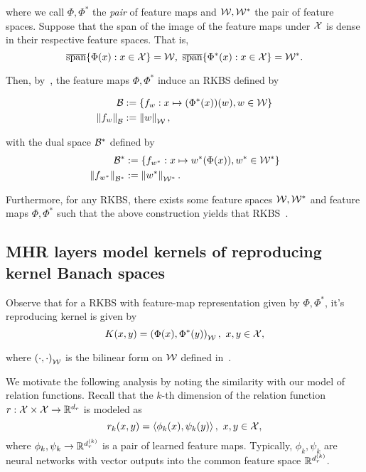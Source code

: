 \noindent where we call $\Phi, \Phi^*$ the \textit{pair} of feature maps and ${\mathcal{W}}, {\mathcal{W}}^*$ the pair of feature spaces. Suppose that the span of the image of the feature maps under ${\mathcal{X}}$ is dense in their respective feature spaces. That is,
\begin{equation}
    \overline{\text{span}}\{\Phi(x): x \in {\mathcal{X}}\} = {\mathcal{W}}, \ \overline{\text{span}}\{\Phi^*(x): x \in {\mathcal{X}}\} = {\mathcal{W}}^*.
\end{equation}

Then, by~\parencite[Theorem 3]{zhangReproducingKernel2009}, the feature maps $\Phi, \Phi^*$ induce an RKBS defined by

\begin{align}
    {\mathcal{B}} &:= \left\{f_w: x \mapsto (\Phi^*(x))(w), w \in {\mathcal{W}}\right\} \\
    \left\lVert f_w\right\rVert_{\mathcal{B}} &:= \left\lVert w\right\rVert_{\mathcal{W}},
\end{align}

\noindent with the dual space ${\mathcal{B}}^*$ defined by
\begin{align}
    {\mathcal{B}}^* &:= \left\{f_{w^*}: x \mapsto w^*(\Phi(x)), w^* \in {\mathcal{W}}^*\right\} \\
    \left\lVert f_{w^*}\right\rVert_{{\mathcal{B}}^*} &:= \left\lVert w^*\right\rVert_{{\mathcal{W}}^*}.
\end{align}

Furthermore, for any RKBS, there exists some feature spaces ${\mathcal{W}}, {\mathcal{W}}^*$ and feature maps $\Phi, \Phi^*$ such that the above construction yields that RKBS~\parencite[Theorem 4]{zhangReproducingKernel2009}.

\subsection{MHR layers model kernels of reproducing kernel Banach spaces}

Observe that for a RKBS with feature-map representation given by $\Phi, \Phi^*$, it's reproducing kernel is given by
\begin{equation}
    K(x, y) = \left(\Phi(x), \Phi^*(y)\right)_{{\mathcal{W}}}, \ x, y \in {\mathcal{X}},
\end{equation}

\noindent where $\left(\cdot, \cdot\right)_{{\mathcal{W}}}$ is the bilinear form on ${\mathcal{W}}$ defined in~.

We motivate the following analysis by noting the similarity with our model of relation functions. Recall that the $k$-th dimension of the relation function $r: {\mathcal{X}} \times {\mathcal{X}} \to \mathbb{R}^{d_r}$ is modeled as
\begin{equation}
    r_k(x, y) = \left \langle \phi_k(x), \psi_k(y) \right\rangle, \ x, y \in {\mathcal{X}},
\end{equation}
\noindent where $\phi_k, \psi_k \to \mathbb{R}^{d_r^{(k)}}$ is a pair of learned feature maps. Typically, $\phi_k, \psi_k$ are neural networks with vector outputs into the common feature space $\mathbb{R}^{d_r^{(k)}}$.

